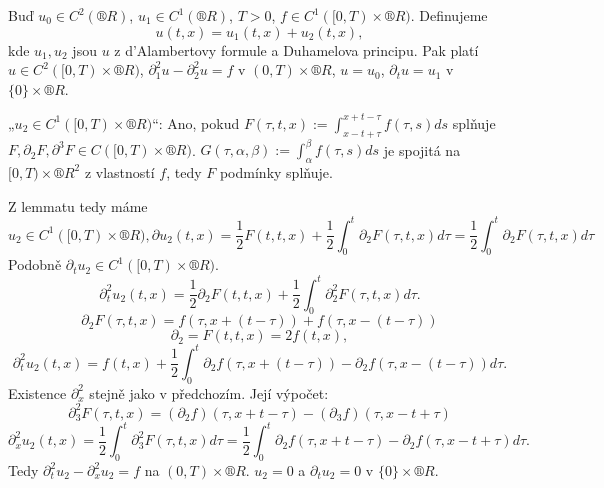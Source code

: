 \documentclass[12pt]{article}					%
\begin{document}
\begin{veta}
	Buď $u_0 \in C^2(®R)$, $u_1 \in C^1(®R)$, $T > 0$, $f \in C^1([0, T) \times ®R)$. Definujeme
	$$ u(t, x) = u_1(t, x) + u_2(t, x), $$
	kde $u_1, u_2$ jsou $u$ z d'Alambertovy formule a Duhamelova principu. Pak platí $u \in C^2([0, T) \times ®R)$, $\partial_1^2 u - \partial_2^2 u = f$ v $(0, T) \times ®R$, $u = u_0$, $\partial_t u = u_1$ v $\{0\} \times ®R$.

	\begin{dukazin}
		„$u_2 \in C^1([0, T) \times ®R)$“: Ano, pokud $F(\tau, t, x) := \int_{x - t + \tau}^{x + t - \tau} f(\tau, s) ds$ splňuje $F, \partial_2 F, \partial^3 F \in C([0, T) \times ®R)$. $G(\tau, \alpha, \beta) := \int_\alpha^\beta f(\tau, s) ds$ je spojitá na $[0, T) \times ®R^2$ z vlastností $f$, tedy $F$ podmínky splňuje.

		Z lemmatu tedy máme
		$$ u_2 \in C^1([0, T) \times ®R), \partial u_2(t, x) = \frac{1}{2} F(t, t, x) + \frac{1}{2} \int_0^t \partial_2 F(\tau, t, x) d\tau = \frac{1}{2} \int_0^t \partial_2 F(\tau, t, x) d\tau $$
		Podobně $\partial_t u_2 \in C^1([0, T) \times ®R)$.
		$$ \partial_t^2 u_2(t, x) = \frac{1}{2} \partial_2 F(t, t, x) + \frac{1}{2} \int_0^t \partial_2^2 F(\tau, t, x) d\tau. $$
		$$ \partial_2 F(\tau, t, x) = f(\tau, x+(t - \tau)) + f(\tau, x - (t - \tau)) $$
		$$ \partial_2 = F(t, t, x) = 2 f(t, x), $$
		$$ \partial_t^2 u_2(t, x) = f(t, x) + \frac{1}{2} \int_0^t \partial_2 f(\tau, x + (t - \tau)) - \partial_2 f(\tau, x - (t - \tau)) d\tau. $$
		Existence $\partial_x^2$ stejně jako v předchozím. Její výpočet:
		$$ \partial_3^2 F(\tau, t, x) = (\partial_2 f)(\tau, x + t - \tau) - (\partial_3 f)(\tau, x - t + \tau) $$
		$$ \partial_x^2 u_2(t, x) = \frac{1}{2} \int_0^t \partial_3^2 F(\tau, t, x) d\tau = \frac{1}{2} \int_0^t \partial_2 f(\tau, x + t - \tau) - \partial_2 f (\tau, x - t + \tau) d\tau. $$
		Tedy $\partial^2_t u_2 - \partial_x^2 u_2 = f$ na $(0, T) \times ®R$. $u_2=0$ a $\partial_t u_2 = 0$ v $\{0\} \times ®R$.
	\end{dukazin}
\end{veta}
\end{document}
